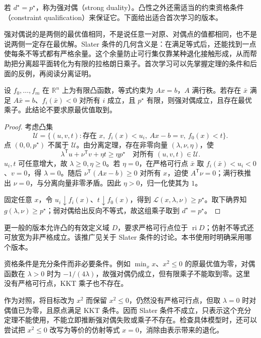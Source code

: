 若 $d^\star=p^\star$，称为强对偶（strong duality）。凸性之外还需适当的约束资格条件（constraint qualification）来保证它。下面给出适合首次学习的版本。

强对偶说的是两侧的最优值相同，不是说任意一对原、对偶点的值都相同，也不是说两侧一定存在最优解。Slater 条件的几何含义是：在满足等式后，还能找到一点使每条不等式都有严格余量。这个余量防止可行集仅靠某种退化接触形成，从而帮助把分离超平面转化为有限的拉格朗日乘子。首次学习可以先掌握定理的条件和后面的反例，再阅读分离证明。

\begin{theorem}
设 $f_0,\ldots,f_m$ 在 $\mathbb R^n$ 上为有限凸函数，等式约束为 $Ax=b$，$A$ 满行秩。若存在 $\bar x$ 满足 $A\bar x=b$、$f_i(\bar x)<0$ 对所有 $i$ 成立，且 $p^\star$ 有限，则强对偶成立，且存在最优乘子。此结论不要求原最优值取到。
\label{thm:co-slater}
\end{theorem}
\begin{proof}
考虑凸集
\[
 \mathcal U=\{(u,v,t):\text{存在 }x,\ f_i(x)<u_i,\ Ax-b=v,\ f_0(x)<t\}.
\]
点 $(0,0,p^\star)$ 不属于 $\mathcal U$。由分离定理，存在非零向量 $(\lambda,\nu,\eta)$，使
\[
 \lambda^{\mathsf T}u+\nu^{\mathsf T}v+\eta t\geq\eta p^\star
 \quad\text{对所有 }(u,v,t)\in\mathcal U.
\]
$u_i,t$ 可任意增大，故 $\lambda\geq0,\eta\geq0$。若 $\eta=0$，在严格可行点 $\bar x$ 取 $f_i(\bar x)<u_i<0$、$v=0$，得 $\lambda=0$。随后 $\nu^{\mathsf T}(Ax-b)\geq0$ 对所有 $x$，迫使 $A^{\mathsf T}\nu=0$；满行秩推出 $\nu=0$，与分离向量非零矛盾。因此 $\eta>0$，归一化使其为 $1$。

固定任意 $x$，令 $u_i\downarrow f_i(x)$、$t\downarrow f_0(x)$，得到 $\mathcal L(x,\lambda,\nu)\geq p^\star$。取下确界知 $g(\lambda,\nu)\geq p^\star$；弱对偶给出反向不等式，故这组乘子取到 $d^\star=p^\star$。
\end{proof}

更一般的版本允许凸的有效定义域 $D$，要求严格可行点位于 $\operatorname{ri}D$；仿射不等式还可放宽为非严格成立。该推广见\cite{boyd-vandenberghe}关于 Slater 条件的讨论。本书使用时明确采用哪个版本。

资格条件是充分条件而非必要条件。例如 $\min_x x$、$x^2\leq0$ 的原最优值为零，对偶函数在 $\lambda>0$ 时为 $-1/(4\lambda)$，故强对偶仍成立，但有限乘子不能取到零。这里没有严格可行点，KKT 乘子也不存在。

作为对照，将目标改为 $x^2$ 而保留 $x^2\leq0$，仍然没有严格可行点，但取 $\lambda=0$ 时对偶值已为零，且原点满足 KKT 条件。因而 Slater 条件不成立，只表示这个充分定理不能使用，不能立即推断强对偶失败或乘子不存在。检查具体模型时，还可以尝试把 $x^2\leq0$ 改写为等价的仿射等式 $x=0$，消除由表示带来的退化。

